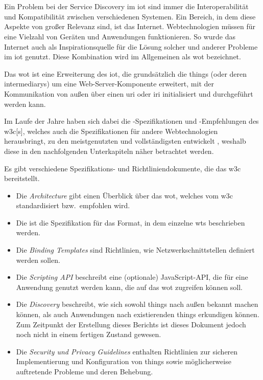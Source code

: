 \section{}\label{sec:wot}

Ein Problem bei der Service Discovery im \gls{iot} sind immer die Interoperabilität und Kompatibilität zwischen verschiedenen Systemen. Ein Bereich, in dem diese Aspekte von großer Relevanz sind, ist das Internet. Webtechnologien müssen für eine Vielzahl von Geräten und Anwendungen funktionieren. So wurde das Internet auch als Inspirationsquelle für die Lösung solcher und anderer Probleme im \gls{iot} genutzt. Diese Kombination wird im Allgemeinen als \gls{wot} bezeichnet.

Das \gls{wot} ist eine Erweiterung des \gls{iot}, die grundsätzlich die \glspl{thing} (oder deren \glspl{intermediary}) um eine Web-Server-Komponente erweitert, mit der Kommunikation von außen über einen \gls{uri} oder \gls{iri} initialisiert und durchgeführt werden kann.

Im Laufe der Jahre haben sich dabei die -Spezifikationen und -Empfehlungen des \gls{w3c}[s], welches auch die Spezifikationen für andere Webtechnologien herausbringt, zu den meistgenutzten und vollständigsten entwickelt \autocite[vgl.][47573]{Sciullo.2022.ASotWoT}, weshalb diese in den nachfolgenden Unterkapiteln näher betrachtet werden.

Es gibt verschiedene Spezifikations- und Richtliniendokumente, die das \gls{w3c} bereitstellt.

\begin{itemize}
  \item Die \emph{Architecture} \autocite{w3c.wot.architecture.20200408} gibt einen Überblick über das \gls{wot}, welches vom \gls{w3c} standardisiert bzw.\ empfohlen wird.
  \item Die \emph{} \autocite{w3c.wot.td.20200623} ist die Spezifikation für das Format, in dem einzelne \glspl{wt} beschrieben werden.
  \item Die \emph{Binding Templates} \autocite{w3c.wot.bt.20200130} sind Richtlinien, wie Netzwerkschnittstellen definiert werden sollen.
  \item Die \emph{Scripting API} \autocite{w3c.wot.scriptingapi.20201124} beschreibt eine (optionale) JavaScript-API, die für eine Anwendung genutzt werden kann, die auf das \gls{wot} zugreifen können soll.
  \item Die \emph{Discovery} \autocite{w3c.wot.discovery.20210602} beschreibt, wie sich sowohl \glspl{thing} nach außen bekannt machen können, als auch Anwendungen nach existierenden \glspl{thing} erkundigen können. Zum Zeitpunkt der Erstellung dieses Berichts ist dieses Dokument jedoch noch nicht in einem fertigen Zustand gewesen.
  \item Die \emph{Security und Privacy Guidelines} \autocite{w3c.wot.spg.20191106} enthalten Richtlinien zur sicheren Implementierung und Konfiguration von \glspl{thing} sowie möglicherweise auftretende Probleme und deren Behebung.
\end{itemize}

